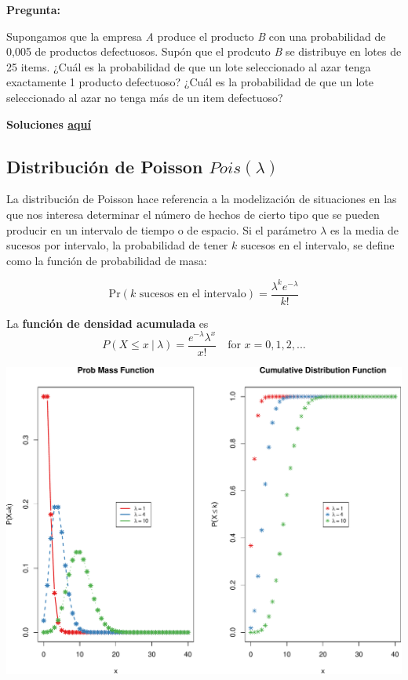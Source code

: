 \documentclass[]{article}
\numberwithin{equation}{section}
\begin{document}
\textbf{Pregunta:}

Supongamos que la empresa \emph{A} produce el producto \emph{B} con una
probabilidad de 0,005 de productos defectuosos. Supón que el prodcuto
\emph{B} se distribuye en lotes de 25 items. ¿Cuál es la probabilidad de
que un lote seleccionado al azar tenga exactamente 1 producto
defectuoso? ¿Cuál es la probabilidad de que un lote seleccionado al azar
no tenga más de un item defectuoso?

\textbf{Soluciones \href{IntroSM_sol.html}{aquí}}

\subsection{\texorpdfstring{Distribución de Poisson
\(Pois(\lambda)\)}{Distribución de Poisson Pois(\textbackslash{}lambda)}}\label{distribucion-de-poisson-poislambda}

La distribución de Poisson hace referencia a la modelización de
situaciones en las que nos interesa determinar el número de hechos de
cierto tipo que se pueden producir en un intervalo de tiempo o de
espacio. Si el parámetro \(\lambda\) es la media de sucesos por
intervalo, la probabilidad de tener \(k\) sucesos en el intervalo, se
define como la función de probabilidad de masa:

\[
\mbox{Pr}(\mbox{$k$ sucesos en el intervalo}) = \frac{\lambda^k e^{-\lambda}}{k!}
\]

La \textbf{función de densidad acumulada} es \[
P(X\leq x ~|~\lambda ) = \frac{e^{-\lambda} \lambda ^x}{x!}\quad \mbox{for $x=0,1,2,...$}
\]

\includegraphics{tema4_files/figure-latex/unnamed-chunk-6-1.pdf}
\end{document}
